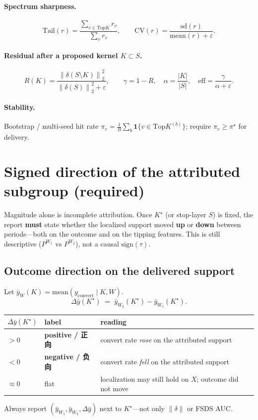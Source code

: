 \documentclass[11pt]{article}
\newcommand{\norm}[1]{\left\|#1\right\|_2}
\newcommand{\Tail}{\mathrm{Tail}}
\newcommand{\CV}{\mathrm{CV}}
\begin{document}
\paragraph{Spectrum sharpness.}
\[
  \Tail(r)
  =\frac{\sum_{v\in\mathrm{Top}K} r_v}{\sum_v r_v},\qquad
  \CV(r)=\frac{\mathrm{sd}(r)}{\mathrm{mean}(r)+\varepsilon}.
\]

\paragraph{Residual after a proposed kernel $K\subset S$.}
\[
  R(K)
  =\frac{\norm{\delta(S\setminus K)}^2}{\norm{\delta(S)}^2+\varepsilon},\qquad
  \gamma=1-R,\quad
  \alpha=\frac{|K|}{|S|},\quad
  \mathrm{eff}=\frac{\gamma}{\alpha+\varepsilon}.
\]

\paragraph{Stability.}
Bootstrap / multi-seed hit rate
$\pi_v=\frac{1}{B}\sum_b \mathbf{1}\{v\in\mathrm{Top}K^{(b)}\}$;
require $\pi_v\ge\pi^\star$ for delivery.

\section{Signed direction of the attributed subgroup (required)}
\label{sec:sign}

Magnitude alone is incomplete attribution.
Once $K^\star$ (or stop-layer $S$) is fixed, the report
\textbf{must} state whether the localized support moved
\textbf{up} or \textbf{down} between periods---both on the
outcome and on the tipping features.
This is still descriptive ($P^{W_1}$ vs $P^{W_2}$), not a
causal $\mathrm{sign}(\tau)$.

\subsection{Outcome direction on the delivered support}
Let $\bar y_W(K)=\mathrm{mean}(y_{\mathrm{convert}}\mid K,W)$.
\[
  \Delta\bar y(K^\star)
  \;=\;
  \bar y_{W_2}(K^\star)-\bar y_{W_1}(K^\star).
\]
\begin{center}
\begin{tabular}{lll}
\toprule
$\Delta\bar y(K^\star)$ & label & reading \\
\midrule
$>0$ & \textbf{positive / 正向} & convert rate \emph{rose} on the attributed support \\
$<0$ & \textbf{negative / 负向} & convert rate \emph{fell} on the attributed support \\
$\approx 0$ & flat & localization may still hold on $X$; outcome did not move \\
\bottomrule
\end{tabular}
\end{center}
Always report $(\bar y_{W_1},\bar y_{W_2},\Delta\bar y)$ next to
$K^\star$---not only $\|\delta\|$ or FSDS AUC.
\end{document}
